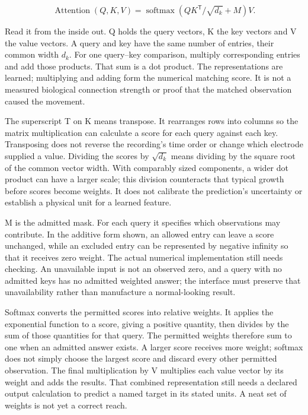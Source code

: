 \[\operatorname{Attention}(Q,K,V)=\operatorname{softmax}\!\left(QK^{\mathsf{T}}/\sqrt{d_k}+M\right)V.\]

Read it from the inside out. Q holds the query vectors, K the key vectors and
V the value vectors. A query and key have the same number of entries, their
common width $d_k$. For one query--key comparison, multiply corresponding
entries and add those products. That sum is a dot product. The representations
are learned; multiplying and adding form the numerical matching score. It is not a measured biological
connection strength or proof that the matched observation caused the movement.

The superscript T on K means transpose. It rearranges rows into columns so
the matrix multiplication can calculate a score for each query against each
key. Transposing does not reverse the recording's time order or change which
electrode supplied a value. Dividing the scores by $\sqrt{d_k}$ means dividing
by the square root of the common vector width. With comparably sized components,
a wider dot product can have a larger scale; this division counteracts that
typical growth before scores become weights. It does not calibrate the
prediction's uncertainty or establish a physical unit for a learned feature.

M is the admitted mask. For each query it specifies which observations may
contribute. In the additive form shown, an allowed entry can leave a score
unchanged, while an excluded entry can be represented by negative infinity
so that it receives zero weight. The actual numerical implementation still
needs checking. An unavailable input is not an observed zero, and a query
with no admitted keys has no admitted weighted answer; the interface must
preserve that unavailability rather than manufacture a normal-looking result.

Softmax converts the permitted scores into relative weights. It applies the
exponential function to a score, giving a positive quantity, then divides
by the sum of those quantities for that query. The permitted weights therefore
sum to one when an admitted answer exists. A larger score receives more weight;
softmax does not simply choose the largest score and discard every other
permitted observation. The final multiplication by V multiplies each value
vector by its weight and adds the results. That combined representation still
needs a declared output calculation to predict a named target in its stated
units. A neat set of weights is not yet a correct reach.

